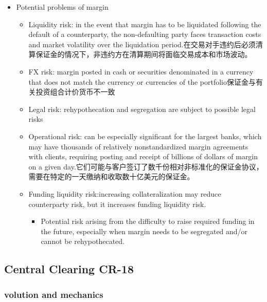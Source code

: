 \begin{itemize}
\item Potential problems of margin
\begin{itemize}
    \item Liquidity risk: in the event that margin has to be liquidated following the default of a counterparty, the non-defaulting party faces transaction costs and market volatility over the liquidation period.在交易对手违约后必须清算保证金的情况下，非违约方在清算期间将面临交易成本和市场波动。
    \item FX risk: margin posted in cash or securities denominated in a currency that does not match the currency or currencies of the portfolio保证金与有关投资组合计价货币不一致
    \item Legal risk: rehypothecation and segregation are subject to possible legal risks
    \item Operational risk: can be especially significant for the largest banks, which may have thousands of relatively nonstandardized margin agreements with clients, requiring
    posting and receipt of billions of dollars of margin on a given day.它们可能与客户签订了数千份相对非标准化的保证金协议，需要在特定的一天缴纳和收取数十亿美元的保证金。
    \item Funding liquidity risk:increasing collateralization may reduce counterparty risk, but it increases funding liquidity risk.
    \begin{itemize}
        \item Potential risk arising from the difficulty to raise required funding in the future, especially when margin needs to be segregated and/or cannot be rehypothecated.
    \end{itemize}


\end{itemize}

\end{itemize}




\subsection{Central Clearing CR-18}
\subsubsection{volution and mechanics}


